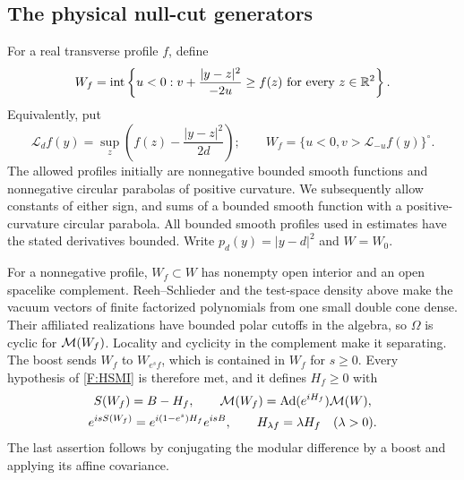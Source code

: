 \subsection{The physical null-cut generators}
\label{F:cuts}

For a real transverse profile $f$, define
\begin{equation}\label{F:cut-definition}
 W_f=\operatorname{int}\left\{u<0:
 v+\frac{|y-z|^2}{-2u}\ge f(z)\text{ for every }z\in\mathbb R^2\right\}.
\end{equation}
Equivalently, put
\[
 \mathcal L_d f(y)=\sup_z\left(f(z)-\frac{|y-z|^2}{2d}\right);
 \qquad W_f=\{u<0, v>\mathcal L_{-u}f(y)\}^{\circ}.
\]
The allowed profiles initially are nonnegative bounded smooth functions
and nonnegative circular parabolas of positive curvature. We subsequently
allow constants of either sign, and sums of a bounded smooth function
with a positive-curvature circular parabola. All bounded smooth profiles
used in estimates have the stated derivatives bounded. Write
$p_d(y)=|y-d|^2$ and $W=W_0$.

For a nonnegative profile, $W_f\subset W$ has nonempty open interior and
an open spacelike complement. Reeh--Schlieder and the test-space density
above make the vacuum vectors of finite factorized polynomials from one
small double cone dense. Their affiliated realizations have bounded polar
cutoffs in the algebra, so $\Omega$ is cyclic for $\mathcal M(W_f)$. Locality and
cyclicity in the complement make it separating.
The boost sends $W_f$ to $W_{e^sf}$, which is contained in $W_f$ for
$s\ge0$. Every hypothesis of \eqref{F:HSMI} is therefore met, and it
defines $H_f\ge0$ with
\begin{equation}\label{F:cut-modular}
 \begin{gathered}
 S(W_f)=B-H_f,\qquad
 \mathcal M(W_f)=\operatorname{Ad}(e^{iH_f})\mathcal M(W),\\
 e^{isS(W_f)}=e^{i(1-e^s)H_f}e^{isB},\qquad
 H_{\lambda f}=\lambda H_f\quad(\lambda>0).
 \end{gathered}
\end{equation}
The last assertion follows by conjugating the modular difference by a
boost and applying its affine covariance.

